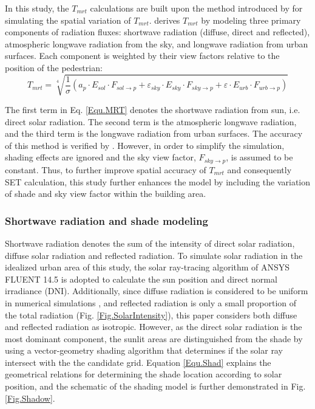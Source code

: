 \documentclass[smallextended]{svjour3}
\begin{document}
In this study, the $T_{mrt}$ calculations are built upon the method introduced by \citet{huang2014citycomfort+} for simulating the spatial variation of $T_{mrt}$.  \citet{huang2014citycomfort+} derives $T_{mrt}$ by modeling three primary components of radiation fluxes: shortwave radiation (diffuse, direct and reflected), atmospheric longwave radiation from the sky, and longwave radiation from urban surfaces. Each component is weighted by their view factors relative to the position of the pedestrian:\\
\begin{equation}
T_{mrt}=\sqrt[4]{\frac{1}{\sigma}(a_{p}{\cdot}E_{sol}{\cdot}F_{sol\rightarrow{p}}+\varepsilon_{sky}{\cdot}E_{sky}{\cdot}F_{sky\rightarrow{p}}+\varepsilon{\cdot}E_{urb}{\cdot}F_{urb\rightarrow{p}})}
\label{Equ.MRT}
\end{equation}

The first term in Eq. \ref{Equ.MRT} denotes the shortwave radiation from sun, i.e. direct solar radiation. The second term is the atmospheric longwave radiation, and the third term is the longwave radiation from urban surfaces. The accuracy of this method is verified by \citet{huang2014citycomfort+}. However, in order to simplify the simulation, shading effects are ignored and the sky view factor, $F_{sky\rightarrow{p}}$, is assumed to be constant. Thus, to further improve spatial accuracy of $T_{mrt}$ and consequently SET calculation, this study further enhances the model by including the variation of shade and sky view factor within the building area.

\subsubsection{Shortwave radiation and shade modeling}
Shortwave radiation denotes the sum of the intensity of direct solar radiation, diffuse solar radiation and reflected radiation. To simulate solar radiation in the idealized urban area of this study, the solar ray-tracing algorithm of ANSYS FLUENT 14.5 is adopted to calculate the sun position and direct normal irradiance (DNI). Additionally, since diffuse radiation is considered to be uniform in numerical simulations \cite{flint1998solar, sreekumar1998egret, madronich1999role}, and reflected radiation is only a small proportion of the total radiation (Fig. \ref{Fig.SolarIntensity}), this paper considers both diffuse and reflected radiation as isotropic. However, as the direct solar radiation is the most dominant component, the sunlit areas are distinguished from the shade by using a vector-geometry shading algorithm that determines if the solar ray intersect with the the candidate grid. Equation \ref{Equ.Shad} explains the geometrical relations for determining the shade location according to solar position, and the schematic of the shading model is further demonstrated in Fig. \ref{Fig.Shadow}. 
\end{document}
